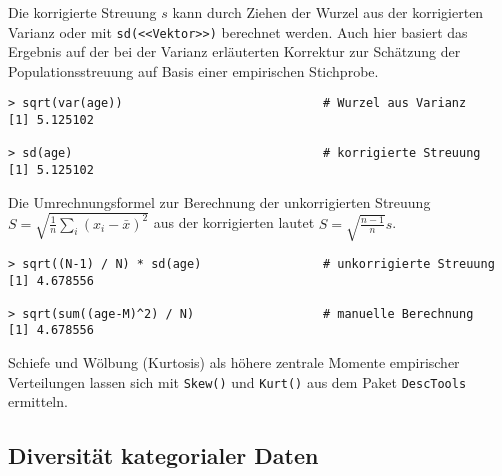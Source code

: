 Die korrigierte Streuung $s$ kann durch Ziehen der Wurzel aus der korrigierten Varianz oder mit \lstinline!sd(<<Vektor>>)! berechnet werden. Auch hier basiert das Ergebnis auf der bei der Varianz erläuterten Korrektur zur Schätzung der Populationsstreuung auf Basis einer empirischen Stichprobe.
\begin{lstlisting}
> sqrt(var(age))                            # Wurzel aus Varianz
[1] 5.125102

> sd(age)                                   # korrigierte Streuung
[1] 5.125102
\end{lstlisting}

Die Umrechnungsformel zur Berechnung der unkorrigierten Streuung $S = \sqrt{\frac{1}{n} \sum_{i}{(x_{i}-\bar{x})^{2}}}$ aus der korrigierten lautet $S = \sqrt{\frac{n-1}{n}} s$.
\begin{lstlisting}
> sqrt((N-1) / N) * sd(age)                 # unkorrigierte Streuung
[1] 4.678556

> sqrt(sum((age-M)^2) / N)                  # manuelle Berechnung
[1] 4.678556
\end{lstlisting}

Schiefe und Wölbung (Kurtosis) als höhere zentrale Momente empirischer Verteilungen lassen sich mit \lstinline!Skew()! und \lstinline!Kurt()! aus dem Paket \lstinline!DescTools! ermitteln.

\subsection{Diversität kategorialer Daten}
\label{sec:divIdx}

